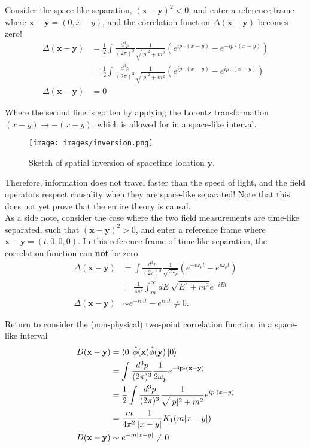 \noindent Consider the space-like separation, $(\textbf{x} - \textbf{y})^2 < 0$, and enter a reference frame where $\textbf{x} - \textbf{y} = (0, x-y)$, and the correlation function $\Delta (\textbf{x} - \textbf{y})$ becomes zero!
\begin{align}
\Delta (\textbf{x} - \textbf{y}) &= \frac{1}{2} \int \frac{d^3 p}{(2\pi)^3} \frac{1}{\sqrt{|p|^2+m^2}} \left( e^{i p \cdot (x-y)} - e^{-ip \cdot (x-y)} \right) \\
&= \frac{1}{2} \int \frac{d^3 p}{(2\pi)^3} \frac{1}{\sqrt{|p|^2+m^2}} \left( e^{i p \cdot (x-y)} - e^{ip \cdot (x-y)} \right) \\
\Delta (\textbf{x} - \textbf{y}) &= 0
\end{align}

\noindent Where the second line is gotten by applying the Lorentz transformation $(x-y) \rightarrow -(x-y)$, which is allowed for in a space-like interval. \\

\begin{figure}[H]
	\centering
	\texttt{[image: images/inversion.png]}
	\caption{Sketch of spatial inversion of spacetime location $\textbf{y}$.}
\end{figure}

\noindent Therefore, information does not travel faster than the speed of light, and the field operators respect causality when they are space-like separated! Note that this does not yet prove that the entire theory is causal. \\

\noindent As a side note, consider the case where the two field measurements are time-like separated, such that $(\textbf{x} - \textbf{y})^2 > 0$, and enter a reference frame where $\textbf{x} - \textbf{y} = (t, 0, 0, 0)$. In this reference frame of time-like separation, the correlation function can \textbf{not} be zero
\begin{align}
\Delta (\textbf{x} - \textbf{y}) &= \int \frac{d^3 p}{(2\pi)^3} \frac{1}{\sqrt{2 \omega_p}} \left( e^{-i\omega_p t} - e^{i\omega_p t} \right) \\
&= \frac{1}{4\pi^2} \int_m^{\infty} dE \, \sqrt{E^2 + m^2} e^{-iEt} \\
\Delta (\textbf{x} - \textbf{y}) &\sim e^{-imt} - e^{imt} \ne 0 .
\end{align}

\noindent Return to consider the (non-physical) two-point correlation function in a space-like interval
\begin{align}
D(\textbf{x}-\textbf{y}) &= \bra{0} \hat{\phi}(\textbf{x}) \hat{\phi}(\textbf{y}) \ket{0} \\
&= \int \frac{d^3 p}{(2\pi)^3} \frac{1}{2 \omega_p} e^{-i \textbf{p} \cdot (\textbf{x}-\textbf{y})} \\
&= \frac{1}{2} \int \frac{d^3 p}{(2\pi)^3} \frac{1}{\sqrt{|p|^2 + m^2}} e^{i p \cdot( x-y)} \\
&= \frac{m}{4\pi^2} \frac{1}{|x-y|} K_1(m|x-y|) \\
D(\textbf{x}-\textbf{y}) &\sim e^{-m|x-y|} \ne 0
\end{align}

